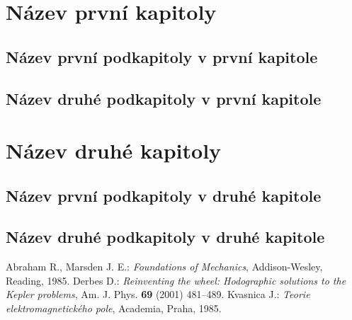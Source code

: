\documentclass[12pt,notitlepage]{report}
\begin{document}
\chapter{Název první kapitoly}

\section{Název první podkapitoly v první kapitole}

\section{Název druhé podkapitoly v první kapitole}

\chapter{Název druhé kapitoly}

\section{Název první podkapitoly v druhé kapitole}

\section{Název druhé podkapitoly v druhé kapitole}



\begin{thebibliography}{99}
 Abraham R., Marsden J. E.: {\em Foundations of Mechanics}, Addison-Wesley, Reading, 1985.
 Derbes D.: {\em Reinventing the wheel: Hodographic solutions to the Kepler problems}, Am. J. Phys. {\bf 69} (2001) 481--489.
 Kvasnica J.: {\em Teorie elektromagnetického pole}, Academia, Praha, 1985.
\end{thebibliography}
\end{document}
